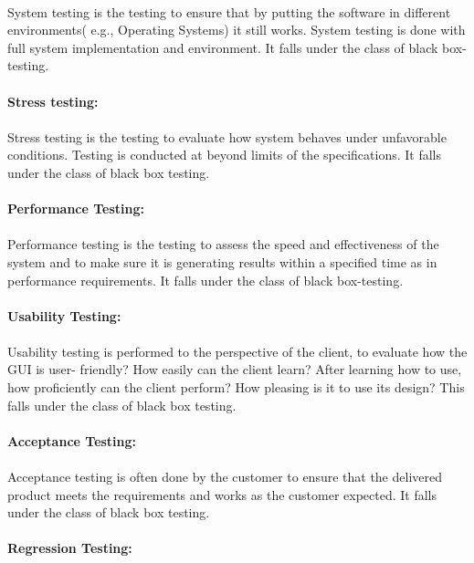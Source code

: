 \documentclass[11pt,a4paper]{report}
\begin{document}
\paragraph{}System testing is the testing to ensure that by putting the software in different environments( e.g., Operating Systems) it still works. System testing is done with full system implementation and environment. It falls under the class of black box-testing.\\
\textbf{\\Stress testing:\\}
\paragraph{}Stress testing is the testing to evaluate how system behaves under unfavorable conditions. Testing is conducted at beyond limits of the specifications. It falls under the class of black box testing.\\
\textbf{\\Performance Testing:\\}
\paragraph{}Performance testing is the testing to assess the speed and effectiveness of the system and to make sure it is generating results within a specified time as in performance requirements. It falls under the class of black box-testing.\\
\textbf{\\Usability Testing:\\}
\paragraph{}Usability testing is performed to the perspective of the client, to evaluate how the GUI is user- friendly? How easily can the client learn? After learning how to use, how proficiently can the client perform? How pleasing is it to use its design? This falls under the class of black box testing.\\
\textbf{\\Acceptance Testing:\\}
\paragraph{}Acceptance testing is often done by the customer to ensure that the delivered product meets the requirements and works as the customer expected. It falls under the class of black box testing.\\
\textbf{\\Regression Testing:\\}
\end{document}
